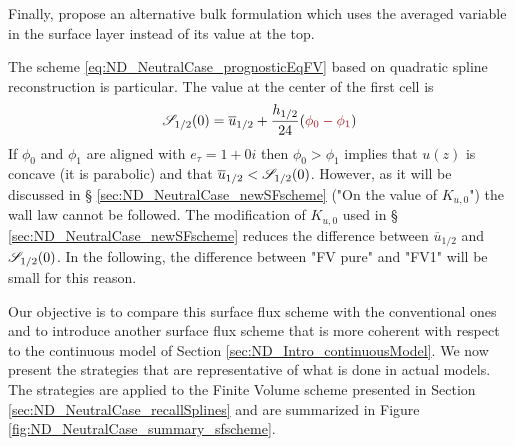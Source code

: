 Finally, \cite{nishizawa_surface_2018} propose an alternative
bulk formulation which uses the averaged variable in the surface layer
instead of its value at the top.
\begin{remark}
The scheme \eqref{eq:ND_NeutralCase_prognosticEqFV} based
	on quadratic spline reconstruction is particular. 
The value at the center of the first cell is
		\begin{equation}
			{\cal S}_{1/2}(0) = \overline{u}_{1/2}
			+ \frac{h_{1/2}}{24} (\emphase{\phi_0-\phi_1})
		\end{equation}
 If $\phi_0$ and $\phi_1$ are aligned with $e_\tau=1+0i$ then
	$\phi_0 > \phi_1$ implies that $u(z)$ is concave
	(it is parabolic) and
	that $\overline{u}_{1/2} < {\cal S}_{1/2}(0)$.
	However, as it will be discussed in \S
	\ref{sec:ND_NeutralCase_newSFscheme}
	("On the value of $K_{u,0}$")
	the wall law cannot be followed.
	The modification of $K_{u,0}$ used in \S
	\ref{sec:ND_NeutralCase_newSFscheme} reduces
	the difference between $\overline{u}_{1/2}$
	and ${\cal S}_{1/2}(0)$.
	In the following, the
	difference between "FV pure" and "FV1"
	will be small for this reason.
\end{remark}
%
Our objective is to compare this surface flux scheme with the
conventional ones
and to introduce another surface flux scheme that is more coherent
with respect to the continuous model of Section
\ref{sec:ND_Intro_continuousModel}.
We now present the strategies that are representative of
what is done in actual models. The strategies are applied to
the Finite Volume scheme presented in Section
\ref{sec:ND_NeutralCase_recallSplines} and are
summarized in Figure \ref{fig:ND_NeutralCase_summary_sfscheme}.
